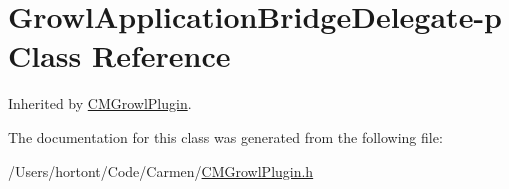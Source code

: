 \hypertarget{class_growl_application_bridge_delegate-p}{
\section{GrowlApplicationBridgeDelegate-p Class Reference}
\label{class_growl_application_bridge_delegate-p}
}
Inherited by \hyperlink{interface_c_m_growl_plugin}{CMGrowlPlugin}.



The documentation for this class was generated from the following file:\begin{CompactItemize}
\item 
/Users/hortont/Code/Carmen/\hyperlink{_c_m_growl_plugin_8h}{CMGrowlPlugin.h}\end{CompactItemize}
